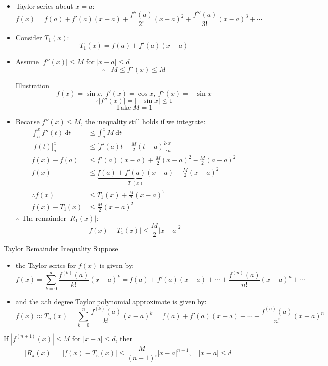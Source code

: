 \documentclass[12pt,a4paper]{article}
\def\d{{\mathrm{d}}}
\begin{document}
\begin{itemize}
	\item Taylor series about $x=a$: $$f(x)=f(a)+f'(a)(x-a)+\frac{f''(a)}{2!}(x-a)^2+\frac{f'''(a)}{3!}(x-a)^3+\cdots$$
	\item Consider $T_1(x)$: $$\boxed{T_1(x)=f(a)+f'(a)(x-a)}$$
	\item Assume $|f''(x)|\leq M$ for $|x-a|\leq d$ $$\therefore -M\leq f''(x)\leq M$$ 
	\begin{eg}{Illustration}
		$$f(x)=\sin{x},\ f'(x)=\cos{x},\ f''(x)=-\sin{x}$$
		$$\therefore |f''(x)|=|-\sin{x}|\leq1$$
		$$\text{Take }M=1$$
	\end{eg}
	\item Because $f''(x)\leq M$, the inequality still holds if we integrate: 
	$$\begin{aligned}
		\int_a^xf''(t)\ \d t&\leq\int_a^x M\ \d t\\
		\bigg[f(t)\bigg]_a^x&\leq\bigg[f'(a)t+\frac{M}{2}(t-a)^2\bigg]_a^x\\
		f(x)-f(a)&\leq f'(a)(x-a)+\frac{M}{2}(x-a)^2-\frac{M}{2}(a-a)^2\\
		f(x)&\leq\underbrace{\boxed{f(a)+f'(a)(x-a)}}_{T_1(x)}+\frac{M}{2}(x-a)^2\\
		\therefore f(x)&\leq T_1(x)+\frac{M}{2}(x-a)^2\\
		f(x)-T_1(x)&\leq\frac{M}{2}(x-a)^2
	\end{aligned}$$
	$\therefore$ The remainder $|R_1(x)|$: 
	$$|f(x)-T_1(x)|\leq\frac{M}{2}|x-a|^2$$
\end{itemize}
\begin{thm}{Taylor Remainder Inequality}
	Suppose
	\begin{itemize}
		\item the Taylor series for $f(x)$ is given by: $$f(x)=\sum^\infty_{k=0}\frac{f^{(k)}(a)}{k!}(x-a)^k=f(a)+f'(a)(x-a)+\cdots+\frac{f^{(n)}(a)}{n!}(x-a)^n+\cdots$$
		\item and the $n$th degree Taylor polynomial approximate is given by: $$f(x)\approx T_n(x)=\sum^{n}_{k=0}\frac{f^{(k)}(a)}{k!}(x-a)^k=f(a)+f'(a)(x-a)+\cdots+\frac{f^{(n)}(a)}{n!}(x-a)^n$$
	\end{itemize}
	If $|f^{(n+1)}(x)|\leq M$ for $|x-a|\leq d$, then
	$$|R_n(x)|=|f(x)-T_n(x)|\leq\frac{M}{(n+1)!}|x-a|^{n+1},\quad |x-a|\leq d$$
\end{thm}
\end{document}
